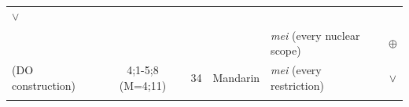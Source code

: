 \documentclass[oneside]{report}
\theoremstyle{definition}
\theoremstyle{definition}
\theoremstyle{definition}
\theoremstyle{remark}
\begin{document}
\begin{longtable}[]{@{}lccclc@{}}
\begin{minipage}[t]{0.13\columnwidth}
\(\lor\)\strut
\end{minipage}\tabularnewline
\begin{minipage}[t]{0.23\columnwidth}\raggedright\strut
\strut
\end{minipage} & \begin{minipage}[t]{0.07\columnwidth}\centering\strut
\strut
\end{minipage} & \begin{minipage}[t]{0.05\columnwidth}\centering\strut
\strut
\end{minipage} & \begin{minipage}[t]{0.10\columnwidth}\centering\strut
\strut
\end{minipage} & \begin{minipage}[t]{0.25\columnwidth}\raggedright\strut
\emph{mei} (every nuclear scope)\strut
\end{minipage} & \begin{minipage}[t]{0.13\columnwidth}\centering\strut
\(\oplus\)\strut
\end{minipage}\tabularnewline
\begin{minipage}[t]{0.23\columnwidth}\raggedright\strut
(DO construction)\strut
\end{minipage} & \begin{minipage}[t]{0.07\columnwidth}\centering\strut
4;1-5;8 (M=4;11)\strut
\end{minipage} & \begin{minipage}[t]{0.05\columnwidth}\centering\strut
34\strut
\end{minipage} & \begin{minipage}[t]{0.10\columnwidth}\centering\strut
Mandarin\strut
\end{minipage} & \begin{minipage}[t]{0.25\columnwidth}\raggedright\strut
\emph{mei} (every restriction)\strut
\end{minipage} & \begin{minipage}[t]{0.13\columnwidth}\centering\strut
\(\lor\)\strut
\end{minipage}\tabularnewline
\begin{minipage}[t]{0.23\columnwidth}\raggedright\strut
\strut
\end{minipage} & \begin{minipage}[t]{0.07\columnwidth}\centering\strut
\strut
\end{minipage} & \begin{minipage}[t]{0.05\columnwidth}\centering\strut
\strut
\end{minipage} & \begin{minipage}[t]{0.10\columnwidth}\centering\strut

\end{minipage}
\end{longtable}
\end{document}
